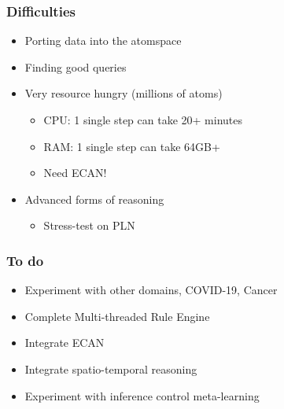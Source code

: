 \documentclass[aspectratio=169]{beamer}
\begin{document}
\begin{frame}
  \frametitle{Difficulties}

  \begin{itemize}
  \item Porting data into the atomspace
  \item Finding good queries
  \item Very resource hungry (millions of atoms)\\
    \begin{itemize}
    \item CPU: 1 single step can take 20+ minutes
    \item RAM: 1 single step can take 64GB+
    \item Need ECAN!
    \end{itemize}
  \item Advanced forms of reasoning\\
    \begin{itemize}
    \item Stress-test on PLN
    \end{itemize}
  \end{itemize}
\end{frame}

\begin{frame}
  \frametitle{To do}

  \begin{itemize}
  \item Experiment with other domains, COVID-19, Cancer
  \item Complete Multi-threaded Rule Engine
  \item Integrate ECAN
  \item Integrate spatio-temporal reasoning
  \item Experiment with inference control meta-learning
  \end{itemize}
\end{frame}
\end{document}
